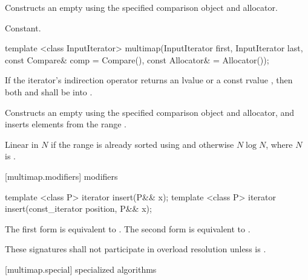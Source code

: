 \begin{itemdescr}
\pnum
\effects
Constructs an empty
using the specified comparison object and allocator.

\pnum
\complexity
Constant.
\end{itemdescr}

%
%
\begin{itemdecl}
template <class InputIterator>
  multimap(InputIterator first, InputIterator last,
           const Compare& comp = Compare(),
           const Allocator& = Allocator());
\end{itemdecl}

\begin{itemdescr}
\pnum
\requires If the iterator's indirection operator returns an lvalue or a
const rvalue , then both
 and  shall be
 into .

\pnum
\effects
Constructs an empty
using the specified comparison object and allocator,
and inserts elements from the range
.

\pnum
\complexity
Linear in $N$ if the range
is already sorted using 
and otherwise $N \log{N}$,
where $N$ is
.
\end{itemdescr}

[multimap.modifiers]{ modifiers}

%
%
\begin{itemdecl}
template <class P> iterator insert(P&& x);
template <class P> iterator insert(const_iterator position, P&& x);
\end{itemdecl}

\begin{itemdescr}
\pnum
\effects
The first form is equivalent to 
. The second form is
equivalent to .

\pnum
\remarks
These signatures shall not participate in overload resolution
unless  is
.
\end{itemdescr}

[multimap.special]{ specialized algorithms}

